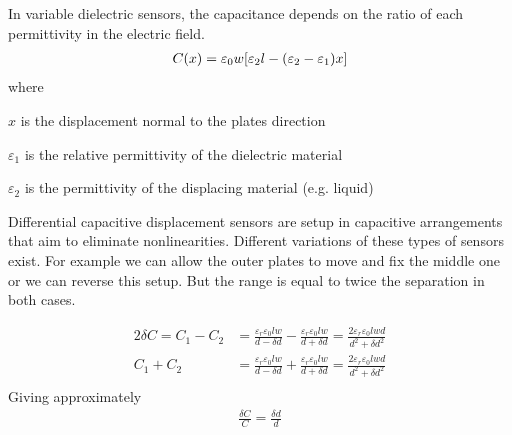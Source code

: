 In variable dielectric sensors, the capacitance depends on the ratio of each permittivity in the electric field.
\begin{align}
   C(x) &= \varepsilon_0 w \bqty{\varepsilon_2 l - \pqty{\varepsilon_2-\varepsilon_1}x}\label{eqn:var_diel_displace}\\
\end{align}
where
\begin{description}[topsep=0ex, noitemsep]
    \item $x$ is the displacement normal to the plates direction
    \item $\varepsilon_1$ is the relative permittivity of the dielectric material
    \item $\varepsilon_2$ is the permittivity of the displacing material (e.g. liquid)
\end{description}
Differential capacitive displacement sensors are setup in capacitive arrangements that aim to eliminate nonlinearities. Different variations of these types of sensors exist. For example we can allow the outer plates to move and fix the middle one or we can reverse this setup. But the range is equal to twice the separation in both cases.

\begin{align}
    2\delta C = C_1-C_2 &= \frac{\varepsilon_r\varepsilon_0 lw}{d-\delta d} - \frac{\varepsilon_r\varepsilon_0 lw}{d+\delta d} = \frac{2\varepsilon_r\varepsilon_0 lwd}{d^2+\delta d^2}\\
    C_1+C_2 &= \frac{\varepsilon_r\varepsilon_0 lw}{d-\delta d} + \frac{\varepsilon_r\varepsilon_0 lw}{d+\delta d} = \frac{2\varepsilon_r\varepsilon_0 lwd}{d^2+\delta d^2}\\
\end{align}
Giving approximately
\begin{align}
    \frac{\delta C}{C} = \frac{\delta d}{d}
\end{align}

